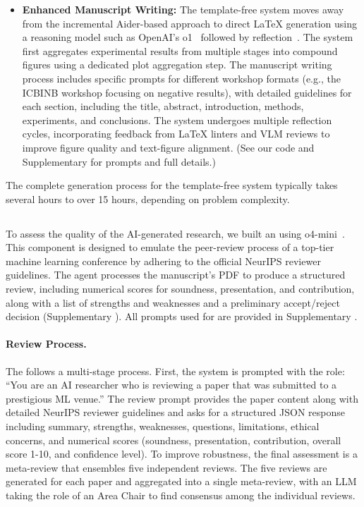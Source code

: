 \begin{itemize}
    \item \textbf{Enhanced Manuscript Writing:} The template-free system moves away from the incremental Aider-based approach to direct LaTeX generation using a reasoning model such as OpenAI's o1~\citep{OpenAIOS} followed by reflection~\citep{shinn2023reflexion}. The system first aggregates experimental results from multiple stages into compound figures using a dedicated plot aggregation step. The manuscript writing process includes specific prompts for different workshop formats (e.g., the ICBINB workshop focusing on negative results), with detailed guidelines for each section, including the title, abstract, introduction, methods, experiments, and conclusions. The system undergoes multiple reflection cycles, incorporating feedback from LaTeX linters and VLM reviews to improve figure quality and text-figure alignment. (See our code and Supplementary  for prompts and full details.)
\end{itemize}

The complete generation process for the template-free system typically takes several hours to over 15 hours, depending on problem complexity.


\subsection*{\ourreviewer}
To assess the quality of the AI-generated research, we built an \ourreviewer using o4-mini~\citep{openai2025o3o4mini}. This component is designed to emulate the peer-review process of a top-tier machine learning conference by adhering to the official NeurIPS reviewer guidelines. The agent processes the manuscript's PDF to produce a structured review, including numerical scores for soundness, presentation, and contribution, along with a list of strengths and weaknesses and a preliminary accept/reject decision (Supplementary ). All prompts used for \ourreviewer are provided in Supplementary . 

\paragraph{Review Process.}
The \ourreviewer follows a multi-stage process. First, the system is prompted with the role: ``You are an AI researcher who is reviewing a paper that was submitted to a prestigious ML venue.'' The review prompt provides the paper content along with detailed NeurIPS reviewer guidelines and asks for a structured JSON response including summary, strengths, weaknesses, questions, limitations, ethical concerns, and numerical scores (soundness, presentation, contribution, overall score 1-10, and confidence level). To improve robustness, the final assessment is a meta-review that ensembles five independent reviews. The five reviews are generated for each paper and aggregated into a single meta-review, with an LLM taking the role of an Area Chair to find consensus among the individual reviews.

